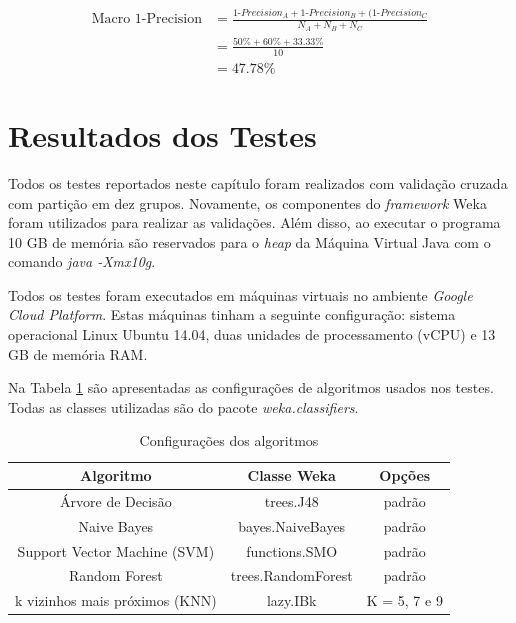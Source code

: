 \begin{align*}
\text{Macro 1-Precision} &= \frac{\text{1-$Precision_A$}+\text{1-$Precision_B$}+(\text{1-$Precision_C$}}{N_A+N_B+N_C} \\
&= \frac{50\%+60\%+33.33\%}{10} \\
&= 47.78\%
\end{align*}

\section{Resultados dos Testes}

Todos os testes reportados neste capítulo foram realizados com validação cruzada com partição em dez grupos.
Novamente, os componentes do \textit{framework} Weka foram utilizados para realizar as validações.
Além disso, ao executar o programa 10 GB de memória são reservados para o \textit{heap} da Máquina Virtual Java com o comando \textit{java -Xmx10g}.

Todos os testes foram executados em máquinas virtuais no ambiente \textit{Google Cloud Platform}. 
Estas máquinas tinham a seguinte configuração: sistema operacional Linux Ubuntu 14.04, duas unidades de processamento (vCPU) e 13 GB de memória RAM.

Na Tabela \ref{tab:algoritmostestes} são apresentadas as configurações de algoritmos usados nos testes. Todas as classes utilizadas são do pacote \textit{weka.classifiers}.

\begin{table}[h!]
  \begin{center}
    \begin{tabular}{ccc}
      \hline
      \textbf{Algoritmo} & \textbf{Classe Weka} & \textbf{Opções} \\
      \hline

      Árvore de Decisão & trees.J48 & padrão \\
      Naive Bayes & bayes.NaiveBayes & padrão \\
      Support Vector Machine (SVM) & functions.SMO & padrão \\
      Random Forest & trees.RandomForest & padrão \\
      k vizinhos mais próximos (KNN) & lazy.IBk & K = 5, 7 e 9 \\

      \hline
    \end{tabular}
    \caption{Configurações dos algoritmos}
    \label{tab:algoritmostestes}
  \end{center}
\end{table}

